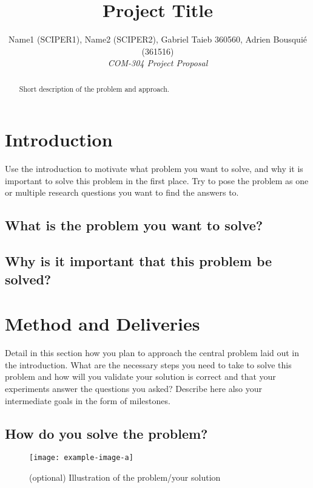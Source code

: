 \documentclass[10pt,conference,compsocconf]{IEEEtran}
\begin{document}
\title{Project Title}

\author{
  Name1 (SCIPER1), Name2 (SCIPER2), Gabriel Taieb 360560, Adrien Bousquié (361516)\\
  \textit{COM-304 Project Proposal}
}

\maketitle

\begin{abstract}
    Short description of the problem and approach.
\end{abstract}


\section{Introduction}
Use the introduction to motivate what problem you want to solve, and why it is important to solve this problem in the first place.
Try to pose the problem as one or multiple research questions you want to find the answers to.

\subsection{What is the problem you want to solve?}

\subsection{Why is it important that this problem be solved?}


\section{Method and Deliveries}
Detail in this section how you plan to approach the central problem laid out in the introduction.
What are the necessary steps you need to take to solve this problem and how will you validate your solution is correct and that your experiments answer the questions you asked?
Describe here also your intermediate goals in the form of milestones.

\subsection{How do you solve the problem?}
\begin{figure}[tbph]
  \centering
  \texttt{[image: example-image-a]}
  \caption{(optional) Illustration of the problem/your solution}
  \vspace{-3mm}
  \label{fig:placeholder1}
\end{figure}
\end{document}
